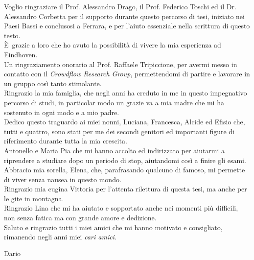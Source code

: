 \documentclass{standalone}
\begin{document}
Voglio ringraziare il Prof. Alessandro Drago, il Prof. Federico Toschi ed il Dr. Alessandro Corbetta per il supporto durante questo percorso di tesi, iniziato nei Paesi Bassi e conclusosi a Ferrara, e per l'aiuto essenziale nella scrittura di questo testo.
\\È grazie a loro che ho avuto la possibilità di vivere la mia esperienza ad Eindhoven.
\\Un ringraziamento onorario al Prof. Raffaele Tripiccione, per avermi messo in contatto con il \emph{Crowdflow Research Group}, permettendomi di partire e lavorare in un gruppo così tanto stimolante.
\\Ringrazio la mia famiglia, che negli anni ha creduto in me in questo impegnativo percorso di studi, in particolar modo un grazie va a mia madre che mi ha sostenuto in ogni modo e a mio padre.
\\Dedico questo traguardo ai miei nonni, Luciana, Francesca, Alcide ed Efisio che, tutti e quattro, sono stati per me dei secondi genitori ed importanti figure di riferimento durante tutta la mia crescita.
\\Antonello e Maria Pia che mi hanno accolto ed indirizzato per aiutarmi a riprendere a studiare dopo un periodo di stop, aiutandomi così a finire gli esami.
\\Abbracio mia sorella, Elena, che, parafrasando qualcuno di famoso, mi permette di viver senza nausea in questo mondo.
\\Ringrazio mia cugina Vittoria per l'attenta rilettura di questa tesi, ma anche per le gite in montagna.
\\Ringrazio Lina che mi ha aiutato e sopportato anche nei momenti più difficili, non senza fatica ma con grande amore e dedizione.
\\Saluto e ringrazio tutti i miei amici che mi hanno motivato e consigliato, rimanendo negli anni miei \emph{cari amici}.

\vspace*{8mm}
\hspace*{13.5cm} Dario
\end{document}
